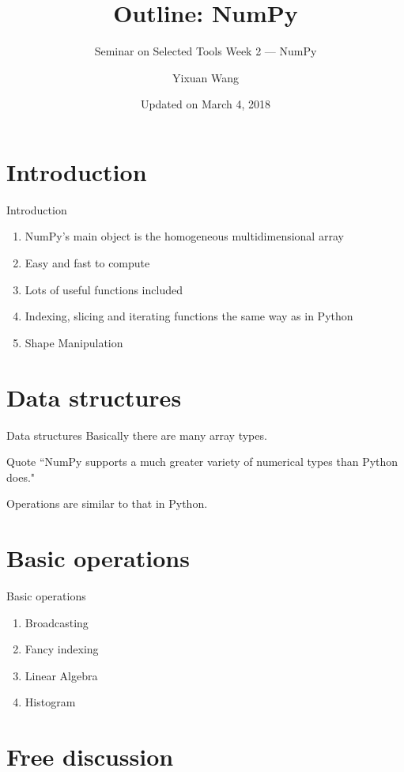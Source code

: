 \documentclass[english, nochinese]{../TeXTemplate/pkuslide}
\title{Outline: NumPy}
\subtitle{Seminar on Selected Tools Week 2 --- NumPy}
\author{Yixuan Wang}
\date{Updated on March 4, 2018}
\begin{document}
\begin{frame}
\titlepage
\end{frame}

\begin{frame}
\tableofcontents[subsectionstyle=hide]
\end{frame}

\section{Introduction}

\begin{frame}
\sectionpage
\end{frame}



\begin{frame}{Introduction}
\begin{enumerate}
\item NumPy’s main object is the homogeneous multidimensional array
\item Easy and fast to compute
\item Lots of useful functions included 
\item Indexing, slicing and iterating functions the same way as in Python 
\item Shape Manipulation 
\end{enumerate}
\end{frame}

\section{Data structures}

\begin{frame}
\sectionpage
\end{frame}

\begin{frame}{Data structures}
Basically there are many array types. 

Quote ``NumPy supports a much greater variety of numerical types than Python does."

Operations are similar to that in Python.
\end{frame}


\section{Basic operations}

\begin{frame}
\sectionpage
\end{frame}

\begin{frame}{Basic operations}
\begin{enumerate}
\item Broadcasting
\item Fancy indexing
\item Linear Algebra 
\item Histogram
\end{enumerate}
\end{frame}

\section{Free discussion}

\begin{frame}
\sectionpage
\end{frame}
\end{document}
